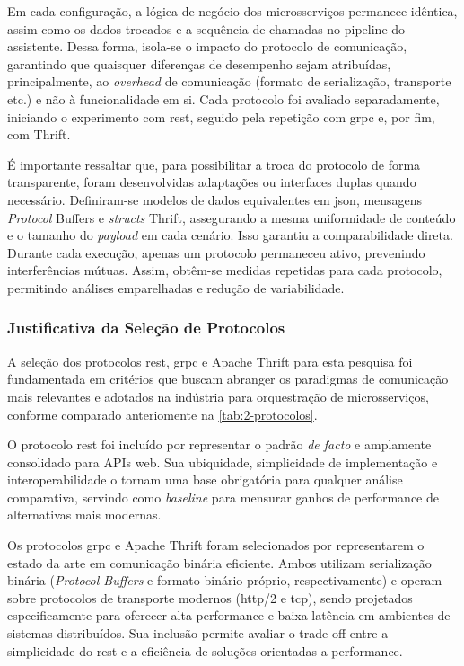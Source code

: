 Em cada configuração, a lógica de negócio dos microsserviços permanece idêntica, assim como os dados trocados e a sequência de chamadas no pipeline do assistente. Dessa forma, isola-se o impacto do protocolo de comunicação, garantindo que quaisquer diferenças de desempenho sejam atribuídas, principalmente, ao \textit{overhead} de comunicação (formato de serialização, transporte etc.) e não à funcionalidade em si. Cada protocolo foi avaliado separadamente, iniciando o experimento com \gls{rest}, seguido pela repetição com \gls{grpc} e, por fim, com Thrift.

É importante ressaltar que, para possibilitar a troca do protocolo de forma transparente, foram desenvolvidas adaptações ou interfaces duplas quando necessário. Definiram-se modelos de dados equivalentes em \acrshort{json}, mensagens \textit{Protocol} Buffers e \textit{structs} Thrift, assegurando a mesma uniformidade de conteúdo e o tamanho do \textit{payload} em cada cenário. Isso garantiu a comparabilidade direta. Durante cada execução, apenas um protocolo permaneceu ativo, prevenindo interferências mútuas. Assim, obtêm-se medidas repetidas para cada protocolo, permitindo análises emparelhadas e redução de variabilidade.

\subsubsection{Justificativa da Seleção de Protocolos}
\label{subsec:justificativa-protocolos}

A seleção dos protocolos \acrshort{rest}, \acrshort{grpc} e Apache Thrift para esta pesquisa foi fundamentada em critérios que buscam abranger os paradigmas de comunicação mais relevantes e adotados na indústria para orquestração de microsserviços, conforme comparado anteriomente na \autoref{tab:2-protocolos}.

O protocolo \acrshort{rest} foi incluído por representar o padrão \textit{de facto} e amplamente consolidado para APIs web. Sua ubiquidade, simplicidade de implementação e interoperabilidade o tornam uma base obrigatória para qualquer análise comparativa, servindo como \textit{baseline} para mensurar ganhos de performance de alternativas mais modernas.

Os protocolos \acrshort{grpc} e Apache Thrift foram selecionados por representarem o estado da arte em comunicação binária eficiente. Ambos utilizam serialização binária (\textit{Protocol Buffers} e formato binário próprio, respectivamente) e operam sobre protocolos de transporte modernos (\acrshort{http}/2 e \acrshort{tcp}), sendo projetados especificamente para oferecer alta performance e baixa latência em ambientes de sistemas distribuídos. Sua inclusão permite avaliar o trade-off entre a simplicidade do \acrshort{rest} e a eficiência de soluções orientadas a performance.


